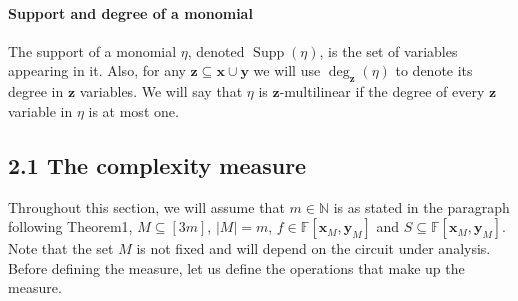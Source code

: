 \documentclass[10pt,a4paper]{article}
\begin{document}
\paragraph{Support and degree of a monomial}
The support of a monomial $\eta$, denoted $\operatorname{Supp}(\eta)$, is the set of variables appearing in it. Also, for any $\mathbf z\subseteq\mathbf x\cup\mathbf y$ we will use $\deg_{\mathbf z}(\eta)$ to denote its degree in $\mathbf z$ variables. We will say that $\eta$ is $\mathbf z$-multilinear if the degree of every $\mathbf z$ variable in $\eta$ is at most one.
\subsection*{2.1 The complexity measure}
Throughout this section, we will assume that $m\in\mathbb N$ is as stated in the paragraph following Theorem1, $M\subseteq[3m]$, $|M|=m$, $f\in\mathbb F[\mathbf x_M,\mathbf y_M]$ and $S\subseteq\mathbb F[\mathbf x_M,\mathbf y_M]$. Note that the set $M$ is not fixed and will depend on the circuit under analysis. Before defining the measure, let us define the operations that make up the measure.
\end{document}
